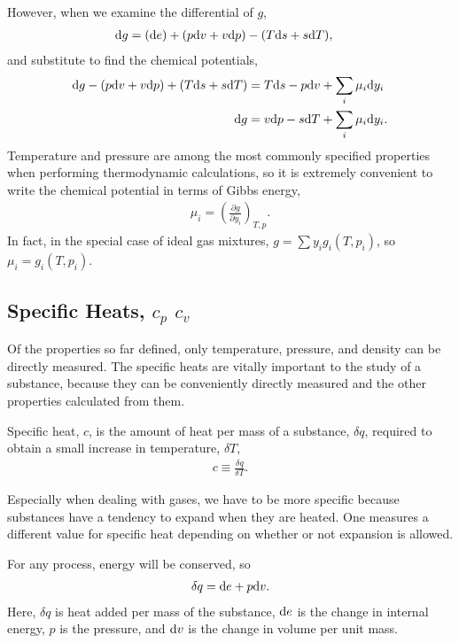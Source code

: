 However, when we examine the differential of $g$,
\begin{align*}
\mathrm{d} g &= (\mathrm{d} e) + (p\mathrm{d} v + v \mathrm{d} p) - (T \mathrm{d} s + s \mathrm{d} T),
\end{align*}
and substitute to find the chemical potentials,
\begin{align*}
\mathrm{d} g - (p \mathrm{d} v + v \mathrm{d} p) + (T \mathrm{d} s + s \mathrm{d} T) &= T \mathrm{d} s - p \mathrm{d} v + \sum_i \mu_i \mathrm{d} y_i\\
\mathrm{d} g &= v \mathrm{d} p - s \mathrm{d} T + \sum_i \mu_i \mathrm{d} y_i.
\end{align*}
Temperature and pressure are among the most commonly specified properties when performing thermodynamic calculations, so it is extremely convenient to write the chemical potential in terms of Gibbs energy,
\begin{align}
\mu_i = \left(\frac{\partial g}{\partial y_i}\right)_{T,p}.
\end{align}
In fact, in the special case of ideal gas mixtures, $g = \sum y_i g_i(T,p_i)$, so $\mu_i = g_i(T,p_i)$.

\subsection{Specific Heats, $c_p$ $c_v$}\label{sec:intro:c}

Of the properties so far defined, only temperature, pressure, and density can be directly measured.  The specific heats are vitally important to the study of a substance, because they can be conveniently directly measured and the other properties calculated from them.

Specific heat, $c$, is the amount of heat per mass of a substance, $\delta q$, required to obtain a small increase in temperature, $\delta T$,
\begin{align}
c \equiv \frac{\delta q}{\delta T}.
\end{align}

Especially when dealing with gases, we have to be more specific because substances have a tendency to expand when they are heated.  One measures a different value for specific heat depending on whether or not expansion is allowed. 

For any process, energy will be conserved, so
\begin{align}
\delta q = \mathrm{d} e + p\mathrm{d} v.\label{eqn:intro:1stlaw}
\end{align}
Here, $\delta q$ is heat added per mass of the substance, $\mathrm{d} e$ is the change in internal energy, $p$ is the pressure, and $\mathrm{d} v$ is the change in volume per unit mass.

